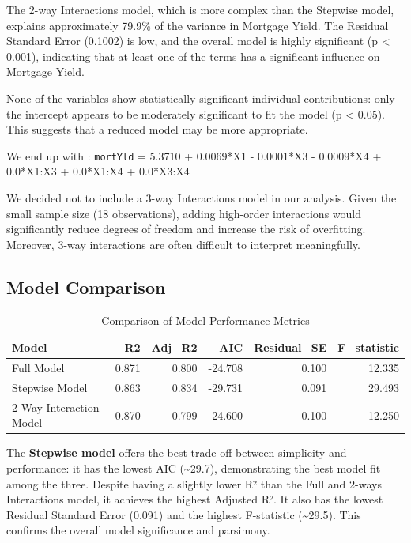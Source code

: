 \documentclass[
  11pt,
]{article}
\begin{document}
The 2-way Interactions model, which is more complex than the Stepwise
model, explains approximately 79.9\% of the variance in Mortgage Yield.
The Residual Standard Error (0.1002) is low, and the overall model is
highly significant (p \textless{} 0.001), indicating that at least one
of the terms has a significant influence on Mortgage Yield.

None of the variables show statistically significant individual
contributions: only the intercept appears to be moderately significant
to fit the model (p \textless{} 0.05). This suggests that a reduced
model may be more appropriate.

We end up with : \texttt{mortYld} = 5.3710 + 0.0069*X1 - 0.0001*X3 -
0.0009*X4 + 0.0*X1:X3 + 0.0*X1:X4 + 0.0*X3:X4

We decided not to include a 3-way Interactions model in our analysis.
Given the small sample size (18 observations), adding high-order
interactions would significantly reduce degrees of freedom and increase
the risk of overfitting. Moreover, 3-way interactions are often
difficult to interpret meaningfully.

\subsection{Model Comparison}\label{model-comparison}

\begingroup\fontsize{8}{10}\selectfont

\begin{longtable}[t]{lrrrrr}
\caption{\label{tab:unnamed-chunk-17}Comparison of Model Performance Metrics}\\
\toprule
Model & R2 & Adj\_R2 & AIC & Residual\_SE & F\_statistic\\
\midrule
Full Model & 0.871 & 0.800 & -24.708 & 0.100 & 12.335\\
Stepwise Model & 0.863 & 0.834 & -29.731 & 0.091 & 29.493\\
2-Way Interaction Model & 0.870 & 0.799 & -24.600 & 0.100 & 12.250\\
\bottomrule
\end{longtable}
\endgroup{}

The \textbf{Stepwise model} offers the best trade-off between simplicity
and performance: it has the lowest AIC (\textasciitilde29.7),
demonstrating the best model fit among the three. Despite having a
slightly lower R² than the Full and 2-ways Interactions model, it
achieves the highest Adjusted R². It also has the lowest Residual
Standard Error (0.091) and the highest F-statistic
(\textasciitilde29.5). This confirms the overall model significance and
parsimony.
\end{document}
